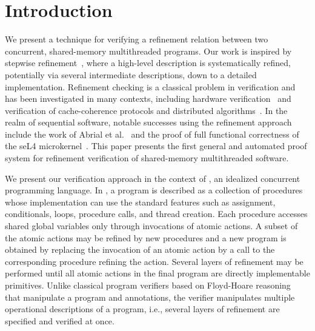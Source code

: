 \section{Introduction}
\label{sec:introduction}

We present a technique for verifying a refinement relation between two concurrent, shared-memory multithreaded programs. 
Our work is inspired by stepwise refinement~\cite{Wirth1971}, where a high-level description is systematically refined, 
potentially via several intermediate descriptions, down to a detailed implementation. 
Refinement checking is a classical problem in verification and has been investigated in many contexts, 
including hardware verification~\cite{Eiriksson2000} and verification of cache-coherence protocols and distributed algorithms~\cite{Lamport2004}.
In the realm of sequential software, notable successes using the refinement approach include the work of Abrial et al.~\cite{AbrialBHHMV10} 
and the proof of full functional correctness of the seL4 microkernel~\cite{KleinAEMSKH14}. 
This paper presents the first general and automated proof system for refinement verification of shared-memory multithreaded software. 

We present our verification approach in the context of \civl, an idealized concurrent programming language.
In \civl, a program is described as a collection of procedures whose implementation 
can use the standard features such as assignment, conditionals, loops, procedure calls, and thread creation. 
Each procedure accesses shared global variables only through invocations of atomic actions.
A subset of the atomic actions may be refined by new procedures and a new program is 
obtained by replacing the invocation of an atomic action by a call to the corresponding procedure refining the action.
Several layers of refinement may be performed until all atomic actions in the final program are directly implementable primitives.
Unlike classical program verifiers based on Floyd-Hoare reasoning~\cite{Floyd67,Hoare69} that manipulate a program and annotations, 
the \civl verifier manipulates multiple operational descriptions of a program, i.e., 
several layers of refinement are specified and verified at once. 

